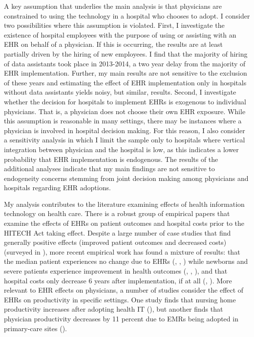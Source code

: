 \documentclass[11pt]{article}
\begin{document}
A key assumption that underlies the main analysis is that physicians are constrained to using the technology in a hospital who chooses to adopt. I consider two possibilities where this assumption is violated. First, I investigate the existence of hospital employees with the purpose of using or assisting with an EHR on behalf of a physician. If this is occurring, the results are at least partially driven by the hiring of new employees. I find that the majority of hiring of data assistants took place in 2013-2014, a two year delay from the majority of EHR implementation. Further, my main results are not sensitive to the exclusion of these years and estimating the effect of EHR implementation only in hospitals without data assistants yields noisy, but similar, results. Second, I investigate whether the decision for hospitals to implement EHRs is exogenous to individual physicians. That is, a physician does not choose their own EHR exposure. While this assumption is reasonable in many settings, there may be instances where a physician is involved in hospital decision making. For this reason, I also consider a sensitivity analysis in which I limit the sample only to hospitals where vertical integration between physician and the hospital is low, as this indicates a lower probability that EHR implementation is endogenous. The results of the additional analyses indicate that my main findings are not sensitive to endogeneity concerns stemming from joint decision making among physicians and hospitals regarding EHR adoptions.


My analysis contributes to the literature examining effects of health information technology on health care. There is a robust group of empirical papers that examine the effects of EHRs on patient outcomes and hospital costs prior to the HITECH Act taking effect. Despite a large number of case studies that find generally positive effects (improved patient outcomes and decreased costs) (surveyed in \cite{Buntin2011TheResults}), more recent empirical work has found a mixture of results: that the median patient experiences no change due to EHRs (\cite{Agha2014TheCare}, \cite{McCullough2016HealthCoordination}, \cite{Meyerhoefer}) while newborns and severe patients experience improvement in health outcomes (\cite{Miller2009}, \cite{Freedman2015}, \cite{McCullough2016HealthCoordination}), and that hospital costs only decrease 6 years after implementation, if at all (\cite{Agha2014TheCare}, \cite{dranove2014trillion}). More relevant to EHR effects on physicians, a number of studies consider the effect of EHRs on productivity in specific settings. One study finds that nursing home productivity increases after adopting health IT (\cite{Hitt2016}), but another finds that physician productivity decreases by 11 percent due to EMRs being adopted in primary-care sites (\cite{Meyerhoefer}). 
\end{document}
